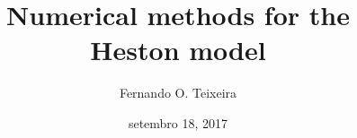 \documentclass[12pt,twoside]{reedthesis}
\title{\textbf{\Huge{Numerical methods for the \\[20pt] Heston model}}}
\author{Fernando O. Teixeira}
\date{setembro 18, 2017}
\theoremstyle{definition}
\theoremstyle{definition}
\theoremstyle{remark}
\begin{document}
      \maketitle
  
  \frontmatter %
  \pagestyle{empty} %
      \begin{acknowledgements}
      \textbf{\\ \\ \\ \\ \\ \\ \\ \\ \\ \\ \\ \\ \\ \\ \\ \\ \\ \\ \\ \\ \\ \\ \\ \\ \\ \\ \\ \\ \\ \\ \\ \\ \\ \\ \\ \\ \\ \\ \\ \\ \\ \\ \\ \\ \\ \\ \\ \\ \\ \\ \\ \\ \\ \\ \\ \\ \\ \\ \\ \\ \\ \\ \\ }

\end{acknowledgements}
\end{document}
